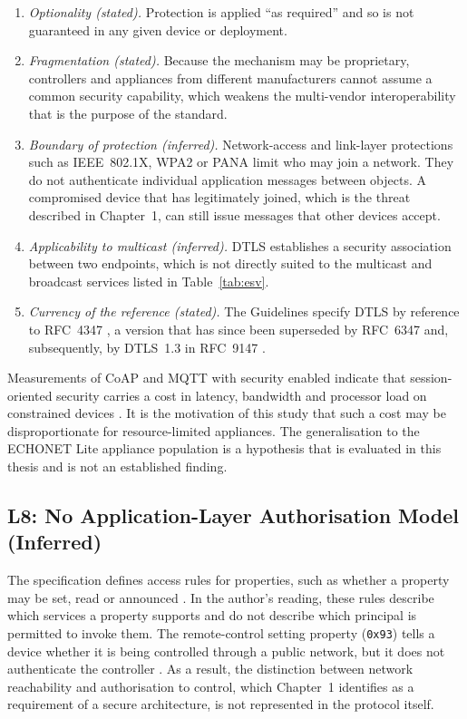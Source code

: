 \begin{enumerate}
  \item \emph{Optionality (stated).} Protection is applied ``as required'' and so is not guaranteed in any given device or deployment.
  \item \emph{Fragmentation (stated).} Because the mechanism may be proprietary, controllers and appliances from different manufacturers cannot assume a common security capability, which weakens the multi-vendor interoperability that is the purpose of the standard.
  \item \emph{Boundary of protection (inferred).} Network-access and link-layer protections such as IEEE~802.1X, WPA2 or PANA limit who may join a network. They do not authenticate individual application messages between objects. A compromised device that has legitimately joined, which is the threat described in Chapter~1, can still issue messages that other devices accept.
  \item \emph{Applicability to multicast (inferred).} DTLS establishes a security association between two endpoints, which is not directly suited to the multicast and broadcast services listed in Table~\ref{tab:esv}.
  \item \emph{Currency of the reference (stated).} The Guidelines specify DTLS by reference to RFC~4347 \cite{ECHONETGuidelines}, a version that has since been superseded by RFC~6347 and, subsequently, by DTLS~1.3 in RFC~9147 \cite{RFC6347,RFC9147}.
\end{enumerate}

Measurements of CoAP and MQTT with security enabled indicate that session-oriented security carries a cost in latency, bandwidth and processor load on constrained devices \cite{Seoane2021,Laaroussi2021}. It is the motivation of this study that such a cost may be disproportionate for resource-limited appliances. The generalisation to the ECHONET Lite appliance population is a hypothesis that is evaluated in this thesis and is not an established finding.

\subsection{L8: No Application-Layer Authorisation Model (Inferred)}

The specification defines access rules for properties, such as whether a property may be set, read or announced \cite{ECHONETPart2}. In the author's reading, these rules describe which services a property supports and do not describe which principal is permitted to invoke them. The remote-control setting property (\texttt{0x93}) tells a device whether it is being controlled through a public network, but it does not authenticate the controller \cite{ECHONETGuidelines}. As a result, the distinction between network reachability and authorisation to control, which Chapter~1 identifies as a requirement of a secure architecture, is not represented in the protocol itself.

